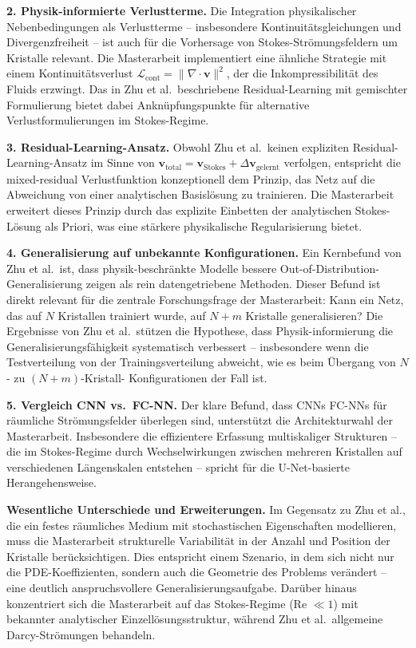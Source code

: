 \documentclass[a4paper,12pt]{article}
\begin{document}
\textbf{2. Physik-informierte Verlustterme.}
Die Integration physikalischer Nebenbedingungen als Verlustterme -- insbesondere
Kontinuitätsgleichungen und Divergenzfreiheit -- ist auch für die Vorhersage von
Stokes-Strömungsfeldern um Kristalle relevant. Die Masterarbeit implementiert eine
ähnliche Strategie mit einem Kontinuitätsverlust $\mathcal{L}_{\text{cont}} = \|\nabla \cdot
\mathbf{v}\|^2$, der die Inkompressibilität des Fluids erzwingt. Das in Zhu et al.\
beschriebene Residual-Learning mit gemischter Formulierung bietet dabei Anknüpfungs\-punkte
für alternative Verlustformulierungen im Stokes-Regime.

\textbf{3. Residual-Learning-Ansatz.}
Obwohl Zhu et al.\ keinen expliziten Residual-Learning-Ansatz im Sinne von
$\mathbf{v}_{\text{total}} = \mathbf{v}_{\text{Stokes}} + \Delta\mathbf{v}_{\text{gelernt}}$
verfolgen, entspricht die mixed-residual Verlustfunktion konzeptionell dem Prinzip,
das Netz auf die Abweichung von einer analytischen Basislösung zu trainieren.
Die Masterarbeit erweitert dieses Prinzip durch das explizite Einbetten der analytischen
Stokes-Lösung als Priori, was eine stärkere physikalische Regularisierung bietet.

\textbf{4. Generalisierung auf unbekannte Konfigurationen.}
Ein Kernbefund von Zhu et al.\ ist, dass physik-beschränkte Modelle bessere
Out-of-Distribution-Generalisierung zeigen als rein datengetriebene Methoden.
Dieser Befund ist direkt relevant für die zentrale Forschungsfrage der Masterarbeit:
Kann ein Netz, das auf $N$ Kristallen trainiert wurde, auf $N{+}m$ Kristalle generalisieren?
Die Ergebnisse von Zhu et al.\ stützen die Hypothese, dass Physik-informierung die
Generalisierungsfähigkeit systematisch verbessert -- insbesondere wenn die Testverteilung
von der Trainingsverteilung abweicht, wie es beim Übergang von $N$- zu $(N{+}m)$-Kristall-
Konfigurationen der Fall ist.

\textbf{5. Vergleich CNN vs.\ FC-NN.}
Der klare Befund, dass CNNs FC-NNs für räumliche Strömungsfelder überlegen sind,
unterstützt die Architekturwahl der Masterarbeit. Insbesondere die effizientere
Erfassung multi\-skaliger Strukturen -- die im Stokes-Regime durch
Wechselwirkungen zwischen mehreren Kristallen auf verschiedenen Längenskalen
entstehen -- spricht für die U-Net-basierte Herangehensweise.

\textbf{Wesentliche Unterschiede und Erweiterungen.}
Im Gegensatz zu Zhu et al., die ein festes räumliches Medium mit stochastischen
Eigenschaften modellieren, muss die Masterarbeit strukturelle Variabilität in der
Anzahl und Position der Kristalle berücksichtigen. Dies entspricht einem Szenario,
in dem sich nicht nur die PDE-Koeffizienten, sondern auch die Geometrie des Problems
verändert -- eine deutlich anspruchsvollere Generalisierungsaufgabe. Darüber hinaus
konzentriert sich die Masterarbeit auf das Stokes-Regime (Re $\ll 1$) mit bekannter
analytischer Einzellösungsstruktur, während Zhu et al.\ allgemeine Darcy-Strömungen
behandeln.
\end{document}
